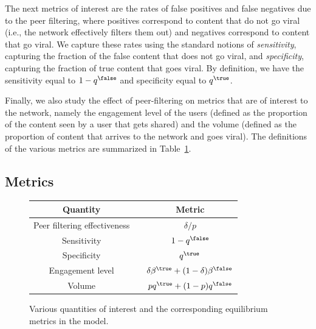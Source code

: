 The next metrics of interest are the rates of false positives and false negatives due to the peer filtering, where positives correspond to content that do not go viral (i.e., the network effectively filters them out) and negatives correspond to content that go viral. We capture these rates using the standard notions of {\em sensitivity}, capturing the fraction of the false content that does not go viral, and {\em specificity}, capturing the fraction of true content that goes viral. By definition, we have the sensitivity equal to $1- q^\false$ and specificity equal to $q^\true$. 

Finally, we also study the effect of peer-filtering on metrics that are of interest to the network, namely the engagement level of the users (defined as the proportion of the content seen by a user that gets shared) and the volume (defined as the proportion of content that arrives to the network and goes viral). The definitions of the various metrics are summarized in Table~\ref{table:metrics}.


\subsection{Metrics}


{\small 
\begin{figure}
\centering
\begin{tabular}{ccc} 
  \toprule
 Quantity  & & Metric \\
 \midrule
 Peer filtering effectiveness &   & ${\delta}/{p}$ \\
  Sensitivity & & $1- q^\false$\\
 Specificity  & & $q^\true$\\
 Engagement level & & $\delta \beta^\true + (1-\delta) \beta^\false$\\
 Volume &  & $pq^\true + (1-p) q^\false$\\
  \bottomrule
\end{tabular}
\caption{Various quantities of interest and the corresponding equilibrium metrics in the model.}\label{table:metrics}

\end{figure} }

